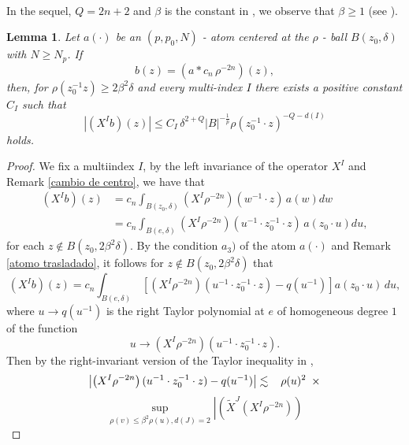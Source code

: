 \documentclass[reqno,10pt]{article}
\newtheorem{lemma}[theorem]{Lemma}
\theoremstyle{definition}
\numberwithin{equation}{section}
\numberwithin{theorem}{section}
\begin{document}
\

In the sequel, $Q = 2n+2$ and $\beta$ is the constant in \cite[Corollary 1.44]{Foll-St}, we observe that $\beta \geq 1$ 
(see \cite[p. 29]{Foll-St}).

\begin{lemma} \label{a conv ro} Let $a(\cdot)$ be an $(p, p_{0}, N)$ - atom centered at the $\rho$ - ball $B(z_0, \delta)$ 
with $N \geq N_p$. If 
\[
b(z) = \left( a \ast c_n \, \rho^{-2n} \right)(z),
\] 
then, for $\rho(z_0^{-1} z) \geq 2 \beta^{2}\delta$ and every multi-index $I$ there exists a positive constant $C_{I}$ such that 
\[
\left| (X^{I}b)(z) \right| \leq C_{I} \, \delta^{2+Q} |B|^{-\frac{1}{p}} \rho(z_{0}^{-1} \cdot z)^{-Q-d(I)}
\]
holds.
\end{lemma}

\begin{proof} We fix a multiindex $I$, by the left invariance of the operator $X^I$ and Remark \ref{cambio de centro}, we have that
\begin{equation*}
\begin{split}
(X^{I}b)(z) & = c_n \int_{B(z_0, \delta)} \left(X^{I} \rho^{-2n} \right)(w^{-1} \cdot z) \, a(w) dw \\
& = c_n \int_{B(e, \delta)} \left(X^{I} \rho^{-2n} \right)(u^{-1} \cdot z_0^{-1} \cdot z) \, a(z_0 \cdot u) du,
\end{split}
\end{equation*}
for each $z \notin B(z_0, 2\beta^{2}\delta)$. By the condition $a_3)$ of the atom $a(\cdot)$ and Remark \ref{atomo trasladado}, it follows for $z \notin B(z_0, 2\beta^{2}\delta)$ that
\begin{equation} \label{Xb}
(X^{I}b)(z) = c_n \int_{B(e, \delta)} \, \left[ \left(X^{I} \rho^{-2n} \right)(u^{-1} \cdot z_0^{-1} \cdot z) - q(u^{-1}) \right] 
a(z_0 \cdot u) \, du,
\end{equation}
where $u \to q(u^{-1})$ is the right Taylor polynomial at $e$ of homogeneous degree $1$ of the function 
\[
u \to \left(X^{I} \rho^{-2n} \right)(u^{-1} \cdot z_{0}^{-1} \cdot z).
\] 
Then by the right-invariant version of the Taylor inequality in \cite[Corollary 1.44]{Foll-St},
\begin{equation*}
\left| \left(X^{I} \rho^{-2n} \right)(u^{-1} \cdot z_{0}^{-1} \cdot z) - q(u^{-1}) \right| \lesssim \hspace{0.3cm} \rho(u)^{2} \,\,\, \times 
\end{equation*}
\begin{equation} \label{Taylor ineq}
\sup_{\rho(v) \leq \beta^{2}\rho(u), d(J)=2} \left|\left(\widetilde{X}^{J} \left(X^{I} \rho^{-2n} \right) \right)

\end{equation}
\end{proof}
\end{document}
